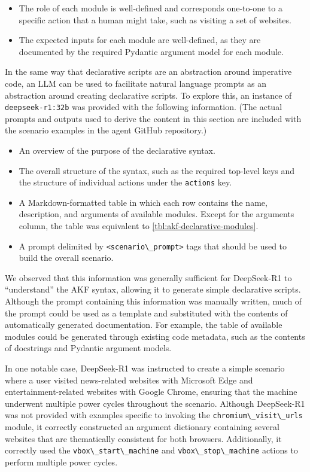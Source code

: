 \documentclass[final,5p,times,twocolumn]{elsarticle}
\newcommand{\passthrough}[1]{#1}
\begin{document}
\begin{itemize}
\item
  The role of each module is well-defined and corresponds one-to-one to
  a specific action that a human might take, such as visiting a set of
  websites.
\item
  The expected inputs for each module are well-defined, as they are
  documented by the required Pydantic argument model for each module.
\end{itemize}

In the same way that declarative scripts are an abstraction around
imperative code, an LLM can be used to facilitate natural language
prompts as an abstraction around creating declarative scripts. To
explore this, an instance of \passthrough{\lstinline!deepseek-r1:32b!}
was provided with the following information. (The actual prompts and
outputs used to derive the content in this section are included with the
scenario examples in the agent GitHub repository.)

\begin{itemize}
\item
  An overview of the purpose of the declarative syntax.
\item
  The overall structure of the syntax, such as the required top-level
  keys and the structure of individual actions under the
  \passthrough{\lstinline!actions!} key.
\item
  A Markdown-formatted table in which each row contains the name,
  description, and arguments of available modules. Except for the
  arguments column, the table was equivalent to
  \autoref{tbl:akf-declarative-modules}.
\item
  A prompt delimited by \passthrough{\lstinline!<scenario\_prompt>!}
  tags that should be used to build the overall scenario.
\end{itemize}

We observed that this information was generally sufficient for
DeepSeek-R1 to ``understand'' the AKF syntax, allowing it to generate
simple declarative scripts. Although the prompt containing this
information was manually written, much of the prompt could be used as a
template and substituted with the contents of automatically generated
documentation. For example, the table of available modules could be
generated through existing code metadata, such as the contents of
docstrings and Pydantic argument models.

In one notable case, DeepSeek-R1 was instructed to create a simple
scenario where a user visited news-related websites with Microsoft Edge
and entertainment-related websites with Google Chrome, ensuring that the
machine underwent multiple power cycles throughout the scenario.
Although DeepSeek-R1 was not provided with examples specific to invoking
the \passthrough{\lstinline!chromium\_visit\_urls!} module, it correctly
constructed an argument dictionary containing several websites that are
thematically consistent for both browsers. Additionally, it correctly
used the \passthrough{\lstinline!vbox\_start\_machine!} and
\passthrough{\lstinline!vbox\_stop\_machine!} actions to perform
multiple power cycles.
\end{document}

